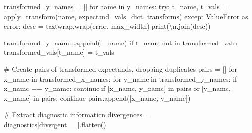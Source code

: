 \documentclass[
  letterpaper,
  DIV=11,
  numbers=noendperiod]{scrartcl}
\newenvironment{Shaded}{\begin{snugshade}}{\end{snugshade}}
\newcommand{\BuiltInTok}[1]{\textcolor[rgb]{0.00,0.23,0.31}{#1}}
\newcommand{\CharTok}[1]{\textcolor[rgb]{0.13,0.47,0.30}{#1}}
\newcommand{\CommentTok}[1]{\textcolor[rgb]{0.37,0.37,0.37}{#1}}
\newcommand{\ControlFlowTok}[1]{\textcolor[rgb]{0.00,0.23,0.31}{#1}}
\newcommand{\ImportTok}[1]{\textcolor[rgb]{0.00,0.46,0.62}{#1}}
\newcommand{\KeywordTok}[1]{\textcolor[rgb]{0.00,0.23,0.31}{#1}}
\newcommand{\NormalTok}[1]{\textcolor[rgb]{0.00,0.23,0.31}{#1}}
\newcommand{\OperatorTok}[1]{\textcolor[rgb]{0.37,0.37,0.37}{#1}}
\newcommand{\PreprocessorTok}[1]{\textcolor[rgb]{0.68,0.00,0.00}{#1}}
\newcommand{\StringTok}[1]{\textcolor[rgb]{0.13,0.47,0.30}{#1}}
\begin{document}
\begin{Shaded}
\begin{Highlighting}[]
\NormalTok{  transformed\_y\_names }\OperatorTok{=}\NormalTok{ []}
  \ControlFlowTok{for}\NormalTok{ name }\KeywordTok{in}\NormalTok{ y\_names:}
    \ControlFlowTok{try}\NormalTok{: }
\NormalTok{      t\_name, t\_vals }\OperatorTok{=}\NormalTok{ apply\_transform(name,}
\NormalTok{                                       expectand\_vals\_dict,}
\NormalTok{                                       transforms)}
    \ControlFlowTok{except} \PreprocessorTok{ValueError} \ImportTok{as}\NormalTok{ error:}
\NormalTok{      desc }\OperatorTok{=}\NormalTok{ textwrap.wrap(error, max\_width)}
      \BuiltInTok{print}\NormalTok{(}\StringTok{\textquotesingle{}}\CharTok{\textbackslash{}n}\StringTok{\textquotesingle{}}\NormalTok{.join(desc))}
    
\NormalTok{    transformed\_y\_names.append(t\_name)}
    \ControlFlowTok{if}\NormalTok{ t\_name }\KeywordTok{not} \KeywordTok{in}\NormalTok{ transformed\_vals:}
\NormalTok{      transformed\_vals[t\_name] }\OperatorTok{=}\NormalTok{ t\_vals}
      
  \CommentTok{\# Create pairs of transformed expectands, dropping duplicates}
\NormalTok{  pairs }\OperatorTok{=}\NormalTok{ []}
  \ControlFlowTok{for}\NormalTok{ x\_name }\KeywordTok{in}\NormalTok{ transformed\_x\_names:}
    \ControlFlowTok{for}\NormalTok{ y\_name }\KeywordTok{in}\NormalTok{ transformed\_y\_names:}
      \ControlFlowTok{if}\NormalTok{ x\_name }\OperatorTok{==}\NormalTok{ y\_name: }
        \ControlFlowTok{continue}
      \ControlFlowTok{if}\NormalTok{ [x\_name, y\_name] }\KeywordTok{in}\NormalTok{ pairs }\KeywordTok{or}\NormalTok{ [y\_name, x\_name] }\KeywordTok{in}\NormalTok{ pairs: }
        \ControlFlowTok{continue}
\NormalTok{      pairs.append([x\_name, y\_name])}
  
  \CommentTok{\# Extract diagnostic information}
\NormalTok{  divergences }\OperatorTok{=}\NormalTok{ diagnostics[}\StringTok{\textquotesingle{}divergent\_\_\textquotesingle{}}\NormalTok{].flatten()}
  

\end{Highlighting}
\end{Shaded}
\end{document}
